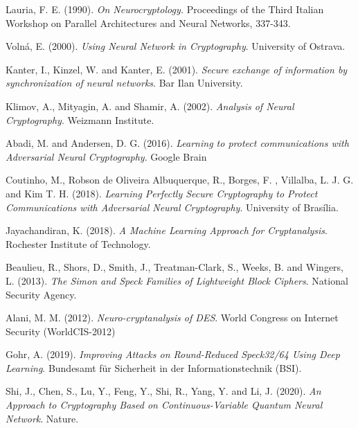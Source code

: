 \documentclass{beamer}
\begin{document}
\begin{frame}
\begin{thebibliography}{99}
 {\sc Lauria, F. E.} (1990). \textit{On Neurocryptology.} Proceedings of the Third Italian Workshop on Parallel Architectures and Neural Networks, 337-343.

 {\sc Volná, E.} (2000). \textit{Using Neural Network in Cryptography}. University of Ostrava.

 {\sc Kanter, I.}, {\sc Kinzel, W.} and {\sc Kanter, E.} (2001). \textit{Secure exchange of information by synchronization of neural networks}. Bar Ilan University.

 {\sc Klimov, A.}, {\sc Mityagin, A.} and {\sc Shamir, A.} (2002). \textit{Analysis of Neural Cryptography}. Weizmann Institute.


 {\sc Abadi, M.} and {\sc Andersen, D. G.} (2016). \textit{Learning to protect communications with Adversarial Neural Cryptography}. Google Brain

\end{thebibliography}
\end{frame}

\begin{frame}
\begin{thebibliography}{99}
 {\sc Coutinho, M.}, {\sc Robson de Oliveira Albuquerque, R.}, {\sc Borges, F. }, {\sc Villalba, L. J. G.} and  {\sc Kim T. H.} (2018). \textit{Learning Perfectly Secure Cryptography to Protect Communications with Adversarial Neural Cryptography}. University of Brasília.

 {\sc Jayachandiran, K.} (2018). \textit{A Machine Learning Approach for Cryptanalysis}. Rochester Institute of Technology.

 {\sc Beaulieu, R.}, {\sc Shors, D.}, {\sc Smith, J.}, {\sc Treatman-Clark, S.}, {\sc Weeks, B.} and {\sc Wingers, L.} (2013). \textit{The Simon and Speck Families of Lightweight Block Ciphers}. National Security Agency.

 {\sc Alani, M. M.} (2012). \textit{Neuro-cryptanalysis of DES}. World Congress on Internet Security (WorldCIS-2012)

 {\sc Gohr, A.} (2019). \textit{Improving Attacks on Round-Reduced Speck32/64 Using Deep Learning}. Bundesamt für Sicherheit in der Informationstechnik (BSI).

 {\sc Shi, J.}, {\sc Chen, S.}, {\sc Lu, Y.}, {\sc Feng, Y.}, {\sc Shi, R.}, {\sc Yang, Y.} and {\sc Li, J.} (2020). \textit{An Approach to Cryptography Based on Continuous-Variable Quantum Neural Network}. Nature.

\end{thebibliography}
\end{frame}
\end{document}
